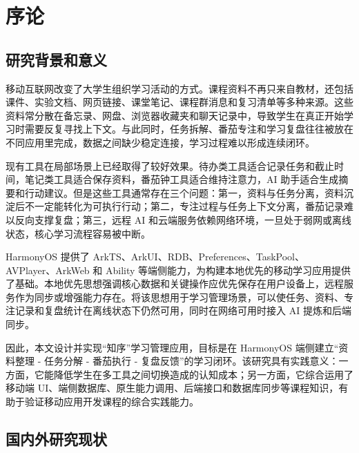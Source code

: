 
\chapter{序论}

\section{研究背景和意义}

移动互联网改变了大学生组织学习活动的方式。课程资料不再只来自教材，还包括课件、实验文档、网页链接、课堂笔记、课程群消息和复习清单等多种来源\cite{crompton2018use,sung2016effects}。这些资料常分散在备忘录、网盘、浏览器收藏夹和聊天记录中，导致学生在真正开始学习时需要反复寻找上下文。与此同时，任务拆解、番茄专注和学习复盘往往被放在不同应用里完成，数据之间缺少稳定连接，学习过程难以形成连续闭环。

现有工具在局部场景上已经取得了较好效果。待办类工具适合记录任务和截止时间，笔记类工具适合保存资料，番茄钟工具适合维持注意力，AI 助手适合生成摘要和行动建议\cite{kasneci2023chatgpt,kabudi2021ai}。但是这些工具通常存在三个问题：第一，资料与任务分离，资料沉淀后不一定能转化为可执行行动；第二，专注过程与任务上下文分离，番茄记录难以反向支撑复盘；第三，远程 AI 和云端服务依赖网络环境，一旦处于弱网或离线状态，核心学习流程容易被中断。

HarmonyOS 提供了 ArkTS、ArkUI、RDB、Preferences、TaskPool、AVPlayer、ArkWeb 和 Ability 等端侧能力，为构建本地优先的移动学习应用提供了基础\cite{harmonyos2024,harmonyosRdb2026,harmonyosTaskPool2026,harmonyosArkWeb2026}。本地优先思想强调核心数据和关键操作应优先保存在用户设备上，远程服务作为同步或增强能力存在\cite{kleppmann2019localfirst}。将该思想用于学习管理场景，可以使任务、资料、专注记录和复盘统计在离线状态下仍然可用，同时在网络可用时接入 AI 提炼和后端同步。

因此，本文设计并实现“知序”学习管理应用，目标是在 HarmonyOS 端侧建立“资料整理 - 任务分解 - 番茄执行 - 复盘反馈”的学习闭环。该研究具有实践意义：一方面，它能降低学生在多工具之间切换造成的认知成本；另一方面，它综合运用了移动端 UI、端侧数据库、原生能力调用、后端接口和数据库同步等课程知识，有助于验证移动应用开发课程的综合实践能力。

\section{国内外研究现状}

